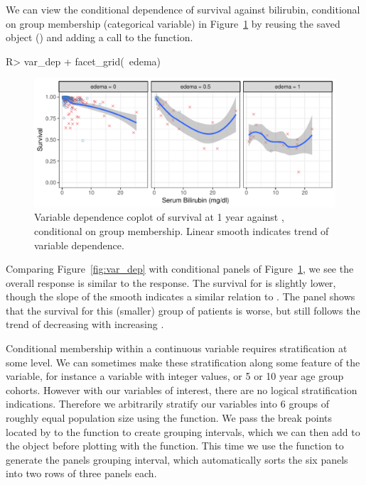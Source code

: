 \documentclass[article]{jss}
\begin{document}
We can view the conditional dependence of survival against bilirubin, conditional on  group membership (categorical variable) in Figure~\ref{fig:coplot_bilirubin} by reusing the saved  object () and adding a call to the  function.
\begin{Schunk}
\begin{Sinput}
R> var_dep + facet_grid(~edema)
\end{Sinput}
\begin{figure}[!htb]

{\centering \includegraphics{fig-rfs/rfs-coplot_bilirubin-1} 

}

\caption[Variable dependence coplot of survival at 1 year against , conditional on  group membership]{Variable dependence coplot of survival at 1 year against , conditional on  group membership. Linear smooth indicates trend of variable dependence.}\label{fig:coplot_bilirubin}
\end{figure}
\end{Schunk}

Comparing Figure~\ref{fig:var_dep} with conditional panels of Figure~\ref{fig:coplot_bilirubin}, we see the overall response is similar to the  response. The survival for  is slightly lower, though the slope of the smooth indicates a similar relation to . The  panel shows that the survival for this (smaller) group of patients is worse, but still follows the trend of decreasing with increasing .

Conditional membership within a continuous variable requires stratification at some level. We can sometimes make these stratification along some feature of the variable, for instance a variable with integer values, or 5 or 10 year age group cohorts. However with our variables of interest, there are no logical stratification indications. Therefore we arbitrarily stratify our variables into 6 groups of roughly equal population size using the  function. We pass the break points located by  to the  function to create grouping intervals, which we can then add to the  object before plotting with the  function. This time we use the  function to generate the panels grouping interval, which automatically sorts the six panels into two rows of three panels each.
\end{document}

